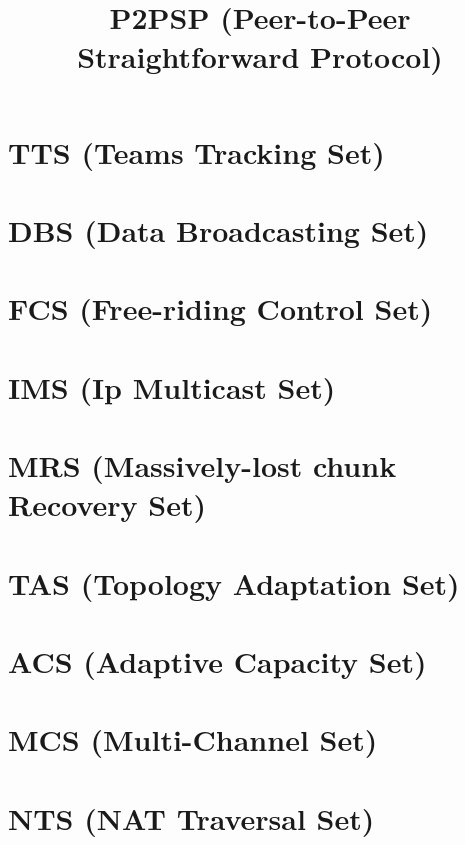 \newcommand{\note}[1]{\color{red}\textbf{#1}}

\title{P2PSP (Peer-to-Peer Straightforward Protocol)}
\maketitle
\tableofcontents

\begin{abstract}

\end{abstract}

\section{TTS (Teams Tracking Set)}


\section{DBS (Data Broadcasting Set)}


\section{FCS (Free-riding Control Set)}


\section{IMS (Ip Multicast Set)}


\section{MRS (Massively-lost chunk Recovery Set)}


\section{TAS (Topology Adaptation Set)}


\section{ACS (Adaptive Capacity Set)}


\section{MCS (Multi-Channel Set)}


\section{NTS (NAT Traversal Set)}



